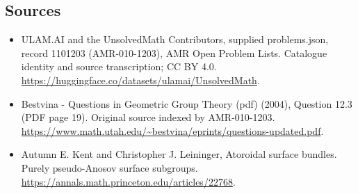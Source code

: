 \documentclass[11pt,a4paper]{article}
\begin{document}
\subsection{Sources}
\begin{itemize}
\item[S1] ULAM.AI and the UnsolvedMath Contributors, supplied problems.json, record 1101203 (AMR-010-1203), AMR Open Problem Lists. Catalogue identity and source transcription; CC BY 4.0.
\url{https://huggingface.co/datasets/ulamai/UnsolvedMath}.
\item[S2] Bestvina - Questions in Geometric Group Theory (pdf) (2004), Question 12.3 (PDF page 19). Original source indexed by AMR-010-1203.
\url{https://www.math.utah.edu/~bestvina/eprints/questions-updated.pdf}.
\item[S3] Autumn E. Kent and Christopher J. Leininger, Atoroidal surface bundles. Purely pseudo-Anosov surface subgroups.
\url{https://annals.math.princeton.edu/articles/22768}.
\end{itemize}
\end{document}
